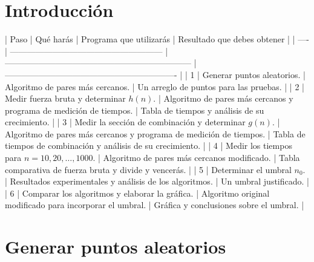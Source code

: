\documentclass[12pt]{article}
\begin{document}
\section{Introducción}
| Paso | Qué harás                                              | Programa que utilizarás                                            | Resultado que debes obtener                                   |
| ---- | ------------------------------------------------------ | ------------------------------------------------------------------ | ------------------------------------------------------------- |
| 1    | Generar puntos aleatorios.                             | Algoritmo de pares más cercanos.                                   | Un arreglo de puntos para las pruebas.                        |
| 2    | Medir fuerza bruta y determinar \(h(n)\).              | Algoritmo de pares más cercanos y programa de medición de tiempos. | Tabla de tiempos y análisis de su crecimiento.                |
| 3    | Medir la sección de combinación y determinar \(g(n)\). | Algoritmo de pares más cercanos y programa de medición de tiempos. | Tabla de tiempos de combinación y análisis de su crecimiento. |
| 4    | Medir los tiempos para \(n=10,20,\ldots,1000\).        | Algoritmo de pares más cercanos modificado.                        | Tabla comparativa de fuerza bruta y divide y vencerás.        |
| 5    | Determinar el umbral \(n_0\).                          | Resultados experimentales y análisis de los algoritmos.            | Un umbral justificado.                                        |
| 6    | Comparar los algoritmos y elaborar la gráfica.         | Algoritmo original modificado para incorporar el umbral.           | Gráfica y conclusiones sobre el umbral.                       |

\section{Generar puntos aleatorios}


\newpage
%
%
\end{document}
